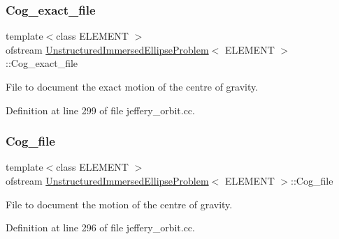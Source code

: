 \subsubsection{\texorpdfstring{Cog\+\_\+exact\+\_\+file}{Cog\_exact\_file}}
{\footnotesize\ttfamily template$<$class E\+L\+E\+M\+E\+NT $>$ \\
ofstream \hyperlink{classUnstructuredImmersedEllipseProblem}{Unstructured\+Immersed\+Ellipse\+Problem}$<$ E\+L\+E\+M\+E\+NT $>$\+::Cog\+\_\+exact\+\_\+file\hspace{0.3cm}{\ttfamily [private]}}



File to document the exact motion of the centre of gravity. 



Definition at line 299 of file jeffery\+\_\+orbit.\+cc.

\mbox{\label{classUnstructuredImmersedEllipseProblem_acd1e8ec8e510f029f449f13dfdebbc99}} 
\subsubsection{\texorpdfstring{Cog\+\_\+file}{Cog\_file}}
{\footnotesize\ttfamily template$<$class E\+L\+E\+M\+E\+NT $>$ \\
ofstream \hyperlink{classUnstructuredImmersedEllipseProblem}{Unstructured\+Immersed\+Ellipse\+Problem}$<$ E\+L\+E\+M\+E\+NT $>$\+::Cog\+\_\+file\hspace{0.3cm}{\ttfamily [private]}}



File to document the motion of the centre of gravity. 



Definition at line 296 of file jeffery\+\_\+orbit.\+cc.

\mbox{\label{classUnstructuredImmersedEllipseProblem_a1c463ed904f01e6466baae0533c79780}} 
